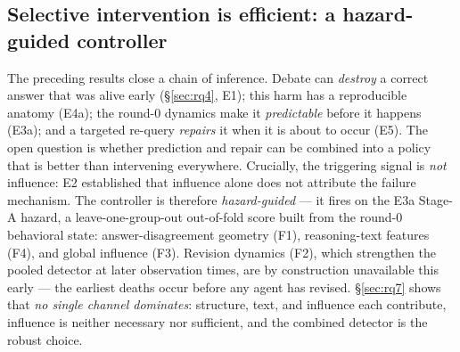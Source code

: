 %

\subsection{Selective intervention is efficient: a hazard-guided controller}
\label{sec:rq6}

The preceding results close a chain of inference. Debate can \emph{destroy} a correct
answer that was alive early (\S\ref{sec:rq4}, E1); this harm has a reproducible
anatomy (E4a); the round-0 dynamics make it \emph{predictable} before it happens
(E3a); and a targeted re-query \emph{repairs} it when it is about to occur (E5). The
open question is whether prediction and repair can be combined into a policy that is
better than intervening everywhere. Crucially, the triggering signal is \emph{not}
influence: E2 established that influence alone does not attribute the failure
mechanism. The controller is therefore \emph{hazard-guided} --- it fires on the E3a
Stage-A hazard, a leave-one-group-out out-of-fold score built from the round-0
behavioral state: answer-disagreement geometry (F1), reasoning-text features (F4), and
global influence (F3). Revision dynamics (F2), which strengthen the pooled detector at
later observation times, are by construction unavailable this early --- the earliest
deaths occur before any agent has revised. \S\ref{sec:rq7} shows that \emph{no single
channel dominates}: structure, text, and influence each contribute, influence is
neither necessary nor sufficient, and the combined detector is the robust choice.

